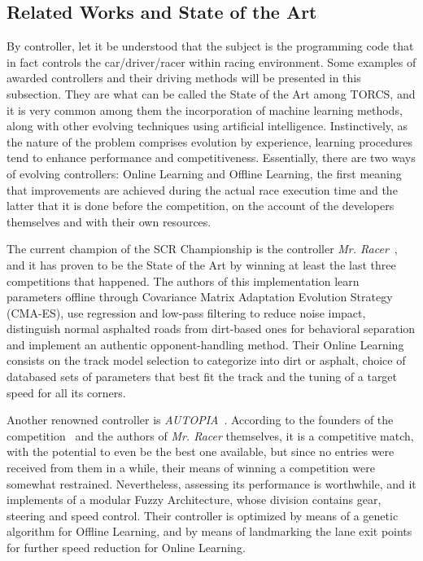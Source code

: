 \subsection{Related Works and State of the Art} \label{subsec:Related}
	By controller, let it be understood that the subject is the programming code that in fact controls the
	car/driver/racer within racing environment. Some examples of awarded controllers and their driving methods
	will be presented in this subsection. They are what can be called the State of the Art among TORCS, and it is
	very common among them the incorporation of machine learning methods, along with other evolving techniques
	using artificial intelligence. Instinctively, as the nature of the problem comprises evolution by experience,
	learning procedures tend to enhance performance and competitiveness. Essentially, there are two ways of
	evolving controllers: Online Learning and Offline Learning, the first meaning that improvements are achieved
	during the actual race execution time and the latter that it is done before the competition, on the account of
	the developers themselves and with their own resources.

	The current champion of the SCR Championship is the controller \emph{Mr. Racer}~\cite{MrRacer}, and it has
	proven to be the State of the Art by winning at least the last three competitions that happened. The authors
	of this implementation learn parameters offline through Covariance Matrix Adaptation Evolution Strategy
	(CMA-ES), use regression and low-pass filtering to reduce noise impact, distinguish normal asphalted roads
	from dirt-based ones for behavioral separation and implement an authentic opponent-handling method. Their
	Online Learning consists on the track model selection to categorize into dirt or asphalt, choice of databased
	sets of parameters that best fit the track and the tuning of a target speed for all its corners.

	Another renowned controller is \emph{AUTOPIA}~\cite{AUTOPIA}. According to the founders of the
	competition~\cite{SCRC} and the authors of \emph{Mr. Racer} themselves, it is a competitive match, with the
	potential to even be the best one available, but since no entries were received from them in a while, their
	means of winning a competition were somewhat restrained. Nevertheless, assessing its performance is
	worthwhile, and it implements of a modular Fuzzy Architecture, whose division contains
	gear, steering and speed control. Their controller is optimized by means of a genetic algorithm for Offline
	Learning, and by means of landmarking the lane exit points for further speed reduction for Online Learning.


